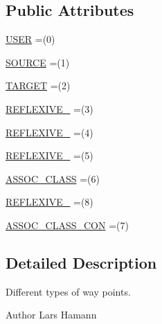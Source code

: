 \subsection*{Public Attributes}
\begin{DoxyCompactItemize}
\item 
\hyperlink{enumorg_1_1tzi_1_1use_1_1gui_1_1views_1_1diagrams_1_1waypoints_1_1_way_point_type_ae023420db76a7b290c2c82b0c784ffd1}{U\-S\-E\-R} =(0)
\item 
\hyperlink{enumorg_1_1tzi_1_1use_1_1gui_1_1views_1_1diagrams_1_1waypoints_1_1_way_point_type_ae483c4554f29bcd78f34d74a45ec807b}{S\-O\-U\-R\-C\-E} =(1)
\item 
\hyperlink{enumorg_1_1tzi_1_1use_1_1gui_1_1views_1_1diagrams_1_1waypoints_1_1_way_point_type_aee2e747e54fba3ecfc5f597b7a3a52fb}{T\-A\-R\-G\-E\-T} =(2)
\item 
\hyperlink{enumorg_1_1tzi_1_1use_1_1gui_1_1views_1_1diagrams_1_1waypoints_1_1_way_point_type_a6306a3c92a823d372dac09326cc88434}{R\-E\-F\-L\-E\-X\-I\-V\-E\-\_} =(3)
\item 
\hyperlink{enumorg_1_1tzi_1_1use_1_1gui_1_1views_1_1diagrams_1_1waypoints_1_1_way_point_type_a1e42ce4867ddf499ae8be81ee9c3b194}{R\-E\-F\-L\-E\-X\-I\-V\-E\-\_} =(4)
\item 
\hyperlink{enumorg_1_1tzi_1_1use_1_1gui_1_1views_1_1diagrams_1_1waypoints_1_1_way_point_type_aff4ba2cf786817a3afd6912a3f1b7aee}{R\-E\-F\-L\-E\-X\-I\-V\-E\-\_} =(5)
\item 
\hyperlink{enumorg_1_1tzi_1_1use_1_1gui_1_1views_1_1diagrams_1_1waypoints_1_1_way_point_type_a0ff7750ac342b5fbdabcfabea076ad4c}{A\-S\-S\-O\-C\-\_\-\-C\-L\-A\-S\-S} =(6)
\item 
\hyperlink{enumorg_1_1tzi_1_1use_1_1gui_1_1views_1_1diagrams_1_1waypoints_1_1_way_point_type_ad71f1d2e593be9d7f76951e0c08bb428}{R\-E\-F\-L\-E\-X\-I\-V\-E\-\_} =(8)
\item 
\hyperlink{enumorg_1_1tzi_1_1use_1_1gui_1_1views_1_1diagrams_1_1waypoints_1_1_way_point_type_ae84bcf38fc6ae9e1a3bbde33f723a797}{A\-S\-S\-O\-C\-\_\-\-C\-L\-A\-S\-S\-\_\-\-C\-O\-N} =(7)
\end{DoxyCompactItemize}


\subsection{Detailed Description}
Different types of way points. \begin{DoxyAuthor}{Author}
Lars Hamann 
\end{DoxyAuthor}


